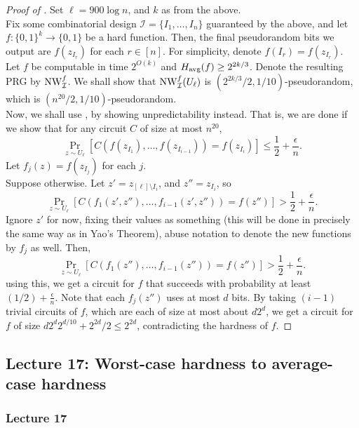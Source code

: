		\begin{proof}[Proof of ]
			Set $\ell = 900 \log n$, and $k$ as from the above.\\
			Fix some combinatorial design $\mathcal{I} = \{I_1,\ldots,I_n\}$ guaranteed by the above, and let $f : \{0,1\}^k \to \{0,1\}$ be a hard function. Then, the final pseudorandom bits we output are $f(z_{I_r})$ for each $r \in [n]$. For simplicity, denote $f(I_r) = f(z_{I_r})$. \\
			Let $f$ be computable in time $2^{O(k)}$ and $H_{\text{avg}}(f) \ge 2^{2k/3}$. Denote the resulting PRG by $\operatorname{NW}_{\mathcal{I}}^f$. We shall show that $\operatorname{NW}_{\mathcal{I}}^f(U_\ell)$ is $(2^{2k/3}/2 , 1/10)$-pseudorandom, which is $(n^{20}/2, 1/10)$-pseudorandom. \\
			Now, we shall use , by showing unpredictability instead. That is, we are done if we show that for any circuit $C$ of size at most $n^{20}$,
			\[ \Pr_{z \sim U_\ell}\left[ C(f(z_{I_1}),\ldots,f(z_{I_{i-1}})) = f(z_{I_i}) \right] \le \frac{1}{2} + \frac{\epsilon}{n}. \]
			Let $f_j(z) = f(z_{I_j})$ for each $j$.\\
			Suppose otherwise. Let $z' = z_{[\ell] \setminus I_i}$, and $z'' = z_{I_i}$, so
			\[ \Pr_{z \sim U_\ell}\left[ C(f_1(z',z''),\ldots,f_{i-1}(z',z'')) = f(z'') \right] > \frac{1}{2} + \frac{\epsilon}{n}. \]
			Ignore $z'$ for now, fixing their values as something (this will be done in precisely the same way as in Yao's Theorem), abuse notation to denote the new functions by $f_j$ as well. Then,
			\[ \Pr_{z \sim U_\ell}\left[ C(f_1(z''),\ldots,f_{i-1}(z'')) = f(z'') \right] > \frac{1}{2} + \frac{\epsilon}{n}. \]
			using this, we get a circuit for $f$ that succeeds with probability at least $(1/2)+\frac{\epsilon}{n}$. Note that each $f_{j}(z'')$ uses at most $d$ bits. By taking $(i-1)$ trivial circuits of $f$, which are each of size at most about $d 2^d$, we get a circuit for $f$ of size $d 2^d 2^{d/10} + 2^{2d}/2 \le 2^{2d}$, contradicting the hardness of $f$.
		\end{proof}

\subsection{Lecture 17: Worst-case hardness to average-case hardness}

	\subsubsection{Lecture 17}

